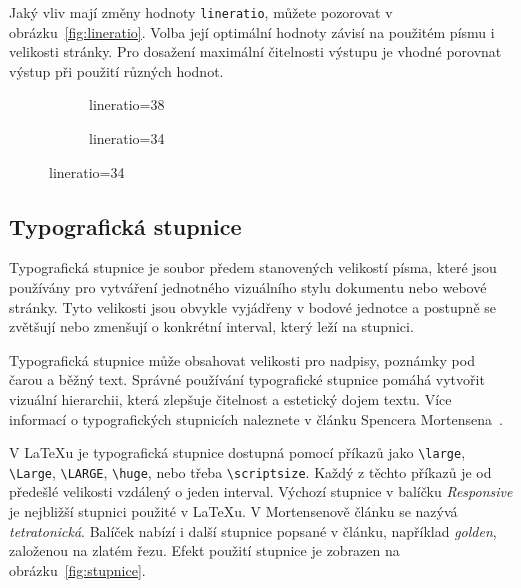\documentclass{csbulletin}
\newcommand\balicek[1]{\textit{#1}}
\begin{document}
Jaký vliv mají změny hodnoty \texttt{lineratio}, můžete pozorovat v obrázku~\ref{fig:lineratio}. 
Volba její optimální hodnoty závisí na použitém písmu i velikosti stránky. 
Pro dosažení maximální čitelnosti výstupu je vhodné porovnat výstup 
při použití různých hodnot.



\begin{figure}[tbp]
  \caption{Změna řádkování změnou hodnoty \texttt{lineratio}}\label{fig:lineratio}
  \begin{subfigure}[b]{0.45\textwidth}
\caption{lineratio=38}
\end{subfigure}
\begin{subfigure}[b]{0.45\textwidth}
\caption{lineratio=34}
\end{subfigure}
\end{figure}

\subsection{Typografická stupnice}

Typografická stupnice je soubor předem stanovených velikostí písma, které jsou
používány pro vytváření jednotného vizuálního stylu dokumentu nebo webové
stránky. Tyto velikosti jsou obvykle vyjádřeny v bodové jednotce a postupně se
zvětšují nebo zmenšují o konkrétní interval, který leží na stupnici.

Typografická stupnice může obsahovat velikosti pro nadpisy, poznámky pod čarou a běžný
text. Správné používání typografické stupnice pomáhá vytvořit vizuální
hierarchii, která zlepšuje čitelnost a estetický dojem textu. 
Více informací o typografických stupnicích naleznete v článku Spencera
Mortensena~\cite{mortensen}. 

V \LaTeX u je typografická stupnice dostupná pomocí příkazů jako \verb|\large|,
\verb|\Large|, \verb|\LARGE|, \verb|\huge|, nebo třeba \verb|\scriptsize|.
Každý z těchto příkazů je od předešlé velikosti vzdálený o jeden interval.
Výchozí stupnice v balíčku \balicek{Responsive} je nejbližší stupnici použité
v \LaTeX u.  V Mortensenově článku se nazývá \textit{tetratonická}. Balíček
nabízí i další stupnice popsané v článku, například \textit{golden}, založenou
na zlatém řezu. Efekt použití stupnice je zobrazen na
obrázku~\ref{fig:stupnice}.
\end{document}
